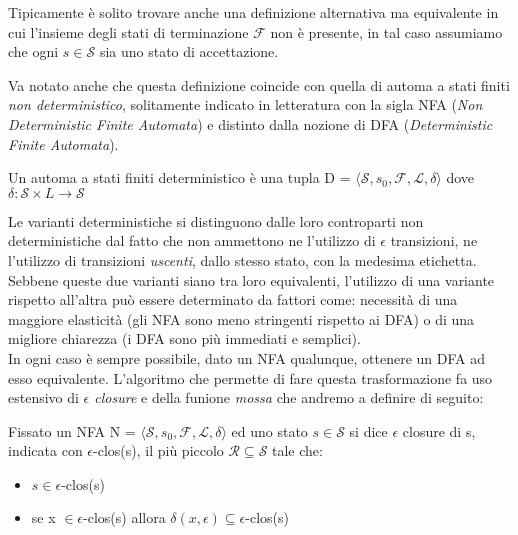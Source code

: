 \begin{remark}
    Tipicamente è solito trovare anche una definizione alternativa ma equivalente in cui l'insieme degli stati di terminazione $\mathcal{F}$ non è presente, in tal caso assumiamo che ogni $s \in \mathcal{S}$ sia uno stato di accettazione.
\end{remark}

\begin{remark}
    Va notato anche che questa definizione coincide con quella di automa a stati finiti \emph{non deterministico}, solitamente indicato in letteratura con la sigla NFA (\emph{Non Deterministic Finite Automata}) e distinto dalla nozione di DFA (\emph{Deterministic Finite Automata}).
\end{remark}

\begin{definition}
    Un automa a stati finiti deterministico è una tupla D = $\langle \mathcal{S}, s_0, \mathcal{F}, \mathcal{L}, \delta \rangle$ dove $\delta : \mathcal{S} \times L \rightarrow \mathcal{S}$
\end{definition}
Le varianti deterministiche si distinguono dalle loro controparti non deterministiche dal fatto che non ammettono ne l'utilizzo di $\epsilon$ transizioni, ne l'utilizzo di transizioni \emph{uscenti}, dallo stesso stato, con la medesima etichetta. Sebbene queste due varianti siano tra loro equivalenti, l'utilizzo di una variante rispetto all'altra può essere determinato da fattori come: necessità di una maggiore elasticità (gli NFA sono meno stringenti rispetto ai DFA) o di una migliore chiarezza (i DFA sono più immediati e semplici).\\
In ogni caso è sempre possibile, dato un NFA qualunque, ottenere un DFA ad esso equivalente. L'algoritmo che permette di fare questa trasformazione fa uso estensivo di \emph{$\epsilon$ closure} e della funione \emph{mossa} che andremo a definire di seguito:

\begin{definition}
    Fissato un NFA N = $\langle \mathcal{S}, s_0, \mathcal{F}, \mathcal{L}, \delta \rangle$ ed uno stato $s \in \mathcal{S}$ si dice $\epsilon$ closure di s, indicata con $\epsilon$-clos(s), il più piccolo $\mathcal{R} \subseteq \mathcal{S}$ tale che:
    \begin{itemize}
        \item $s \in \epsilon$-clos(s)
        \item se x $\in \epsilon$-clos(s) allora $\delta(x, \epsilon) \subseteq \epsilon$-clos(s)
    \end{itemize}
\end{definition}

